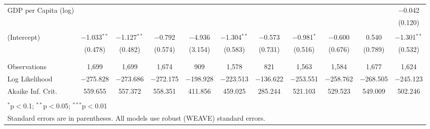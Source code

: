 \documentclass[a4paper]{article}\usepackage[]{graphicx}\usepackage[]{color}
\begin{document}
\begin{table}
\begin{center}
{{\begin{tabular}{@{\extracolsep{5pt}}lcccccccccc}
 GDP per Capita (log) &  &  &  &  &  &  &  &  &  & $-$0.042 \\ 
  &  &  &  &  &  &  &  &  &  & (0.120) \\ 
  & & & & & & & & & & \\ 
 (Intercept) & $-$1.033$^{**}$ & $-$1.127$^{**}$ & $-$0.792 & $-$4.936 & $-$1.304$^{**}$ & $-$0.573 & $-$0.981$^{*}$ & $-$0.600 & 0.540 & $-$1.301$^{**}$ \\ 
  & (0.478) & (0.482) & (0.574) & (3.154) & (0.583) & (0.731) & (0.516) & (0.676) & (0.789) & (0.532) \\ 
  & & & & & & & & & & \\ 
\hline \\[-1.8ex] 
Observations & 1,699 & 1,699 & 1,674 & 909 & 1,578 & 821 & 1,563 & 1,584 & 1,677 & 1,624 \\ 
Log Likelihood & $-$275.828 & $-$273.686 & $-$272.175 & $-$198.928 & $-$223.513 & $-$136.622 & $-$253.551 & $-$258.762 & $-$268.505 & $-$245.123 \\ 
Akaike Inf. Crit. & 559.655 & 557.372 & 558.351 & 411.856 & 459.025 & 285.244 & 521.103 & 529.523 & 549.009 & 502.246 \\ 
\hline 
\hline \\[-1.8ex] 
\multicolumn{11}{l}{$^{*}$p$<$0.1; $^{**}$p$<$0.05; $^{***}$p$<$0.01} \\ 
\multicolumn{11}{l}{Standard errors are in parentheses. All models use robust (WEAVE) standard errors.} \\ 
\end{tabular} 

}}
\end{center}

\end{table}
\end{document}
